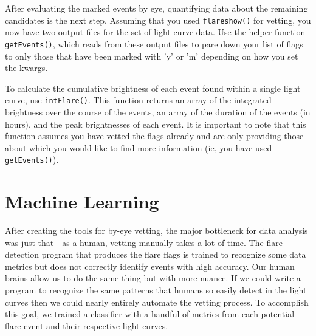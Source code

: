 \documentclass[11pt]{article}
\begin{document}
After evaluating the marked events by eye, quantifying data about the
remaining candidates is the next step.  Assuming that you used
\verb|flareshow()| for vetting, you now have two output files for the
set of light curve data.  Use the helper function \verb|getEvents()|,
which reads from these output files to pare down your list of flags to
only those that have been marked with 'y' or 'm' depending on how you
set the kwargs.

To calculate the cumulative brightness of each event found within a
single light curve, use \verb|intFlare()|.  This function returns an
array of the integrated brightness over the course of the events, an
array of the duration of the events (in hours), and the peak
brightnesses of each event.  It is important to note that this
function assumes you have vetted the flags already and are only
providing those about which you would like to find more information
(ie, you have used \verb|getEvents()|).


\section{Machine Learning}
\label{sec:ml}

After creating the tools for by-eye vetting, the major bottleneck for
data analysis was just that---as a human, vetting manually takes a lot
of time.  The flare detection program that produces the flare flags is
trained to recognize some data metrics but does not correctly identify
events with high accuracy.  Our human brains allow us to do the same
thing but with more nuance.  If we could write a program to recognize
the same patterns that humans so easily detect in the light curves then
we could nearly entirely automate the vetting process.  To accomplish
this goal, we trained a classifier with a handful of metrics from each
potential flare event and their respective light curves.
\end{document}

